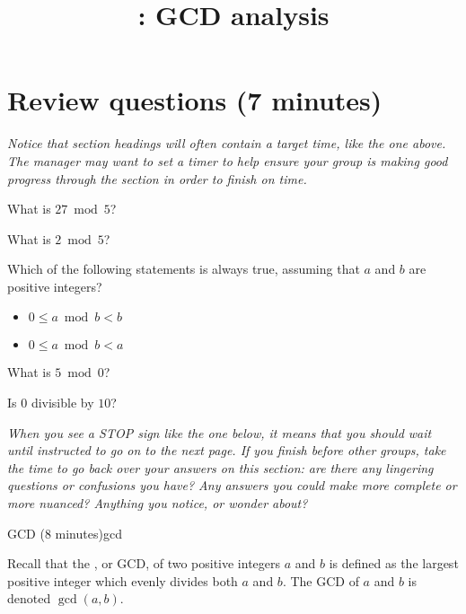 \documentclass{tufte-handout}
\title{\thecourse: GCD analysis}
\date{}
\begin{document}
\maketitle

\section{Review questions (7 minutes)}

\begin{mdframed}
  \emph{Notice that section headings will often contain a target time,
like the one above.  The manager may want to set a timer to help
ensure your group is making good progress through the section in order
to finish on time.}
\end{mdframed}

\begin{questions}
  \item What is $27 \bmod 5$?
  \item What is $2 \bmod 5$?
  \item Which of the following statements is always true, assuming that $a$
    and $b$ are positive integers?
    \begin{itemize}
    \item $0 \leq a \bmod b < b$
    \item $0 \leq a \bmod b < a$
    \end{itemize}
  \item What is $5 \bmod 0$?
  \item Is $0$ divisible by $10$?
\end{questions}
\vfill
\begin{mdframed}[innerrightmargin=1cm]
  \emph{When you see a STOP sign like the one below, it means that you
    should wait until instructed to go on to the next page.  If you
    finish before other groups, take the time to go back over your
    answers on this section: are there any lingering questions or
    confusions you have? Any answers you could make more complete or
    more nuanced?  Anything you notice, or wonder about?}
\end{mdframed}
\pause

\begin{model*}{GCD (8 minutes)}{gcd}
\begin{defn}
  Recall that the , or GCD, of two
  positive integers $a$ and $b$ is defined as the largest positive
  integer which evenly divides both $a$ and $b$.  The GCD of $a$ and
  $b$ is denoted $\gcd(a,b)$.
\end{defn}
\end{model*}
\end{document}
